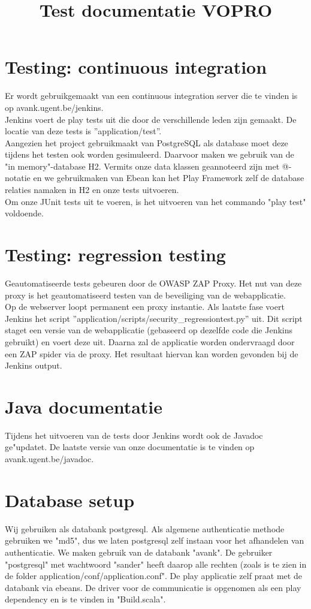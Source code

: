 \documentclass[10pt,a4paper]{article}
\title{Test documentatie VOPRO}
\begin{document}
\section*{Testing: continuous integration}
Er wordt gebruikgemaakt van een continuous integration server die te vinden is op avank.ugent.be/jenkins.\\
Jenkins voert de play tests uit die door de verschillende leden zijn gemaakt. De locatie van deze tests is ''application/test''. \\

Aangezien het project gebruikmaakt van PostgreSQL als database moet deze tijdens het testen ook worden gesimuleerd. Daarvoor maken we gebruik van de "in memory"-database H2. Vermits onze data klassen geannoteerd zijn met @-notatie en we gebruikmaken van Ebean kan het Play Framework zelf de database relaties namaken in H2 en onze tests uitvoeren.\\

Om onze JUnit tests uit te voeren, is het uitvoeren van het commando "play test" voldoende.

\section*{Testing: regression testing}
Geautomatiseerde tests gebeuren door de OWASP ZAP Proxy. Het nut van deze proxy is het geautomatiseerd testen van de beveiliging van de webapplicatie. \\
Op de webserver loopt permanent een proxy instantie. Als laatste fase voert Jenkins het script ''application/scripts/security\_regressiontest.py'' uit. Dit script staget een versie van de webapplicatie (gebaseerd op dezelfde code die Jenkins gebruikt) en voert deze uit. Daarna zal de applicatie worden ondervraagd door een ZAP spider via de proxy. Het resultaat hiervan kan worden gevonden bij de Jenkins output. 

\section*{Java documentatie}
Tijdens het uitvoeren van de tests door Jenkins wordt ook de Javadoc ge"updatet. 
De laatste versie van onze documentatie is te vinden op avank.ugent.be/javadoc.

\section*{Database setup}
Wij gebruiken als databank postgresql. Als algemene authenticatie methode gebruiken we "md5", dus we laten postgresql zelf instaan voor het afhandelen van authenticatie. 
We maken gebruik van de databank "avank". De gebruiker "postgresql" met wachtwoord "sander" heeft daarop alle rechten (zoals is te zien in de folder application/conf/application.conf".
De play applicatie zelf praat met de databank via ebeans. De driver voor de communicatie is opgenomen als een play dependency en is te vinden in "Build.scala".\\
\end{document}
